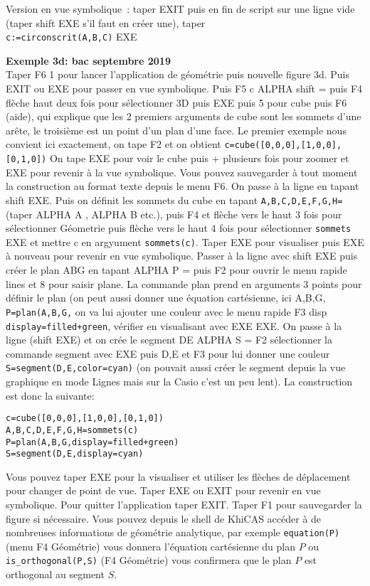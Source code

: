 \documentclass{article}
\begin{document}
\begin{giacjshere}
Version en vue symbolique~:
taper EXIT puis en fin de script sur une ligne vide (taper shift EXE s'il
faut en créer une), taper\\
\verb|c:=circonscrit(A,B,C)| EXE

{\bf Exemple 3d: bac septembre 2019~}\\
Taper F6 1 pour lancer l'application de géométrie puis nouvelle figure 3d.
Puis EXIT ou EXE pour passer en vue symbolique. Puis F5 c ALPHA shift =
puis F4 flèche haut deux fois pour sélectionner 3D puis EXE puis 5 pour cube
puis F6 (aide), qui explique que
les 2 premiers arguments de cube sont les sommets d'une ar\^ete,
le troisième est un point d'un plan d'une face. Le premier
exemple nous convient ici exactement, on tape F2 et on obtient
\verb|c=cube([0,0,0],[1,0,0],[0,1,0])|
On tape EXE pour voir le cube puis + plusieurs fois pour zoomer et EXE
pour revenir à la vue symbolique.
Vous pouvez sauvegarder à tout moment la construction au format
texte depuis
le menu F6.
On passe à la ligne en tapant shift EXE. Puis on définit les sommets
du cube en tapant \verb|A,B,C,D,E,F,G,H=|
(taper ALPHA A , ALPHA B etc.), puis F4 et flèche vers le haut 3 fois
pour sélectionner Géometrie puis flèche vers le haut 4 fois pour sélectionner
\verb|sommets| EXE et mettre c en argyument \verb|sommets(c)|.
Taper EXE pour visualiser puis EXE à nouveau pour revenir en vue
symbolique. Passer à la ligne avec shift EXE puis créer le plan ABG
en tapant ALPHA P = puis F2 pour
ouvrir le menu rapide lines et 8 pour saisir plane. La commande plan
prend en arguments 3 points pour définir le plan (on peut aussi donner
une équation cartésienne, ici A,B,G, \verb|P=plan(A,B,G,|
on va lui ajouter une couleur avec le menu rapide F3 disp
\verb|display=filled+green|, vérifier en visualisant avec EXE EXE.
On passe à la ligne (shift EXE) et on crée le segment DE
ALPHA S = F2 sélectionner la commande segment avec EXE
puis D,E et F3 pour lui donner une couleur
\verb|S=segment(D,E,color=cyan)|
(on pouvait aussi créer le segment depuis la vue graphique en mode Lignes
mais sur la Casio c'est un peu lent).
La construction est donc la suivante:
\begin{verbatim}
c=cube([0,0,0],[1,0,0],[0,1,0])
A,B,C,D,E,F,G,H=sommets(c)
P=plan(A,B,G,display=filled+green)
S=segment(D,E,display=cyan)
\end{verbatim}
Vous pouvez taper EXE pour la visualiser et utiliser les flèches de
déplacement pour changer de point de vue. Taper EXE ou EXIT pour revenir
en vue symbolique. Pour quitter l'application taper EXIT. Taper F1 pour
sauvegarder la figure si nécessaire.
Vous pouvez depuis le shell de KhiCAS accéder à de nombreuses informations
de géométrie analytique, par exemple \verb|equation(P)| (menu
F4 Géométrie) vous donnera
l'équation cartésienne du plan $P$ ou \verb|is_orthogonal(P,S)|
(F4 Géométrie) vous confirmera que le plan $P$ est orthogonal au segment $S$.



\end{giacjshere}
\end{document}
